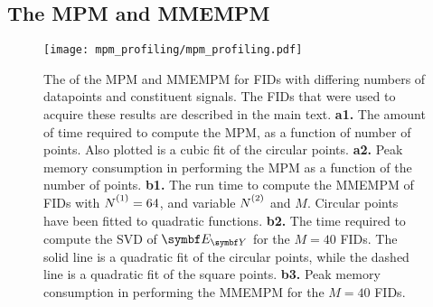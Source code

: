 \subsection{The \acs{MPM} and \acs{MMEMPM}}
\label{subsec:mpm-profiling}
\begin{figure}
    \centering
    \texttt{[image: mpm\_profiling/mpm\_profiling.pdf]}
    \caption[
        The run time and peak memory consumption of
        the \acs{MPM} and \acs{MMEMPM}
        for \acsp{FID} with differing numbers of
        datapoints and constituent signals.
    ]
    {
        The  of
        the \acs{MPM} and \acs{MMEMPM}
        for \acsp{FID} with differing numbers of
        datapoints and constituent signals.
        The \acp{FID} that were used to acquire these results are described in
        the main text.
        \textbf{a1.} The amount of time required to compute the \ac{MPM}, as a
        function of number of points. Also plotted is a cubic fit of the
        circular points.
        \textbf{a2.} Peak memory consumption in performing the \ac{MPM} as a
        function of the number of points.
        \textbf{b1.} The run time to compute the \ac{MMEMPM} of
        \acp{FID} with $\None = 64$, and variable $\Ntwo$ and $M$. Circular
        points have been fitted to quadratic functions.
        \textbf{b2.} The time required to compute the \ac{SVD} of $\EY$ for the
        $M=40$ \acp{FID}. The solid line is a quadratic fit of the circular
        points, while the dashed line is a quadratic fit of the square points.
        \textbf{b3.} Peak memory consumption in performing the \ac{MMEMPM} for
        the $M=40$ \acp{FID}.
    }
    \label{fig:mpm-profiling}
\end{figure}

